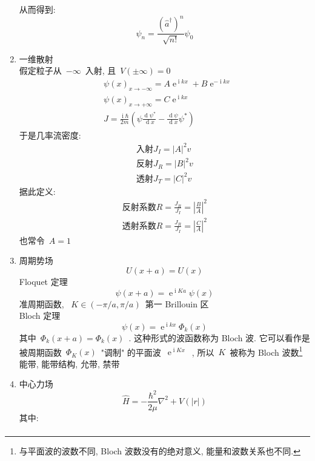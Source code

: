 \documentclass[11pt,a4paper,twocolumn,fleqn]{article}%
\DeclareMathOperator{\dif}{d}
\DeclareMathOperator{\mi}{i}
\DeclareMathOperator{\e}{e}%
\renewcommand{\[}{~$}
\renewcommand{\]}{$~}%
\begin{document}
\begin{enumerate}
 	从而得到: 
 	\begin{equation}
 	 \psi_n = \frac{(\hat a^\dagger)^n}{\sqrt{n!}}\psi_0
 	\end{equation}
 \item 一维散射\\
   假定粒子从\[-\infty\]入射, 且\[V(\pm\infty) = 0\]
 	\begin{align}
 	 &\psi(x)_{x\to -\infty} = A\e^{\mi kx} + B\e^{-\mi kx} \\
 	 &\psi(x)_{x\to +\infty} = C\e^{\mi kx} \\
 	 &J = \frac{\mi \hbar}{2m}\left(\psi\frac{\dif \psi^*}{\dif x} - \frac{\dif\psi}{\dif x}\psi^*\right)
 	\end{align}
 	于是几率流密度:
 	 \begin{align}
 	  \mbox{入射} J_I = |A|^2v \\
 	  \mbox{反射} J_R = |B|^2v \\
 	  \mbox{透射} J_T = |C|^2v
 	 \end{align}
 	据此定义:
 	 \begin{align}
 	  \mbox{反射系数} R = \frac{J_R}{J_I} = \left|\frac{B}{A}\right|^2 \\
 	  \mbox{透射系数} R = \frac{J_R}{J_I} = \left|\frac{C}{A}\right|^2
 	 \end{align}
 	也常令\[A=1\]
 \item 周期势场
	  \begin{equation}
	   U(x + a) = U(x)
	  \end{equation}
	  Floquet 定理
	  \begin{equation}
	   \psi(x+a) = \e^{\mi K a} \psi (x)
	  \end{equation}
	  准周期函数, \[K\in (-\pi/a , \pi/a)\]第一 Brillouin 区\\
	  Bloch 定理
	  \begin{equation}
	   \psi(x) = \e^{\mi k x}\Phi_k(x)
	  \end{equation}
	  其中\[\Phi_k(x + a) = \Phi_k(x)\]. 这种形式的波函数称为 Bloch 波. 它可以看作是被周期函数\[\Phi_K (x)\]"调制" 的平面波\[\e^{\mi Kx}\], 所以\[K\]被称为 Bloch 波数\footnote{与平面波的波数不同, Bloch 波数没有的绝对意义, 能量和波数关系也不同.}\\
	  能带, 能带结构, 允带, 禁带
	 \item 中心力场
	  \begin{equation}
	   \hat H = -\frac{\hbar^2}{2\mu}\nabla^2 + V(|r|)
	  \end{equation}
	  其中:
	  \begin{align}

\end{align}
\end{enumerate}
\end{document}
